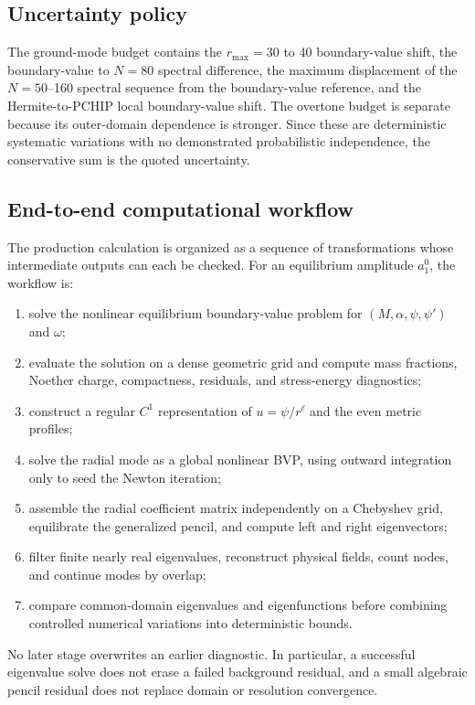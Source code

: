 \documentclass[aps,prd,preprint,onecolumn,nofootinbib,superscriptaddress,showkeys]{revtex4-2}
\newcommand{\rmax}{r_{\mathrm{max}}}
\begin{document}
\subsection{Uncertainty policy}

The ground-mode budget contains the $\rmax=30$ to 40 boundary-value shift, the boundary-value to $N=80$ spectral difference, the maximum displacement of the $N=50$--160 spectral sequence from the boundary-value reference, and the Hermite-to-PCHIP local boundary-value shift. The overtone budget is separate because its outer-domain dependence is stronger. Since these are deterministic systematic variations with no demonstrated probabilistic independence, the conservative sum is the quoted uncertainty.

\subsection{End-to-end computational workflow}

The production calculation is organized as a sequence of transformations whose intermediate outputs can each be checked. For an equilibrium amplitude $a_1^0$, the workflow is:
\begin{enumerate}[leftmargin=2.1em]
\item solve the nonlinear equilibrium boundary-value problem for $(M,\alpha,\psi,\psi')$ and $\omega$;
\item evaluate the solution on a dense geometric grid and compute mass fractions, Noether charge, compactness, residuals, and stress-energy diagnostics;
\item construct a regular $C^1$ representation of $u=\psi/r^\ell$ and the even metric profiles;
\item solve the radial mode as a global nonlinear BVP, using outward integration only to seed the Newton iteration;
\item assemble the radial coefficient matrix independently on a Chebyshev grid, equilibrate the generalized pencil, and compute left and right eigenvectors;
\item filter finite nearly real eigenvalues, reconstruct physical fields, count nodes, and continue modes by overlap;
\item compare common-domain eigenvalues and eigenfunctions before combining controlled numerical variations into deterministic bounds.
\end{enumerate}
No later stage overwrites an earlier diagnostic. In particular, a successful eigenvalue solve does not erase a failed background residual, and a small algebraic pencil residual does not replace domain or resolution convergence.
\end{document}
